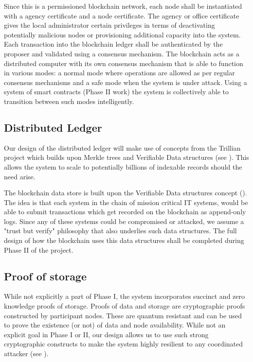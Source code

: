 Since this is a permissioned blockchain network, each node shall be instantiated with a agency certificate and a node
certificate. The agency or office certificate gives the local administrator certain privileges in terms of deactivating
potentially malicious nodes or provisioning additional capacity into the system. Each transaction into the blockchain
ledger shall be authenticated by the proposer and validated using a consensus mechanism. The blockchain acts as a
distributed computer with its own consensus mechanism that is able to function in various modes: a normal mode where
operations are allowed as per regular consensus mechanisms and a safe mode when the system is under attack. Using a
system of smart contracts (Phase II work) the system is collectively able to transition between such modes intelligently.

\subsection{Distributed Ledger}

Our design of the distributed ledger will make use of concepts from the Trillian project which builds upon Merkle trees
and Verifiable Data structures (see \cite{verifiable2015}). This allows the system to scale to potentially billions of
indexable records should the need arise.

The blockchain data store is built upon the Verifiable Data structures concept (\cite{verifiable2015}). The idea is that each
system in the chain of mission critical IT systems, would be able to submit transactions which get recorded on the
blockchain as append-only logs. Since any of these systems could be compromised or attacked, we assume a "trust but
verify" philosophy that also underlies such data structures. The full design of how the blockchain uses this data
structures shall be completed during Phase II of the project.

\subsection{Proof of storage}

While not explicitly a part of Phase I, the system incorporates succinct and zero knowledge proofs of storage. Proofs
of data and storage are cryptographic proofs constructed by participant nodes. These are quantum resistant and can be
used to prove the existence (or not) of data and node availability. While not an explicit goal in Phase I or II, our
design allows us to use such strong cryptographic constructs to make the system highly resilient to any coordinated
attacker (see \cite{ben2019}).

